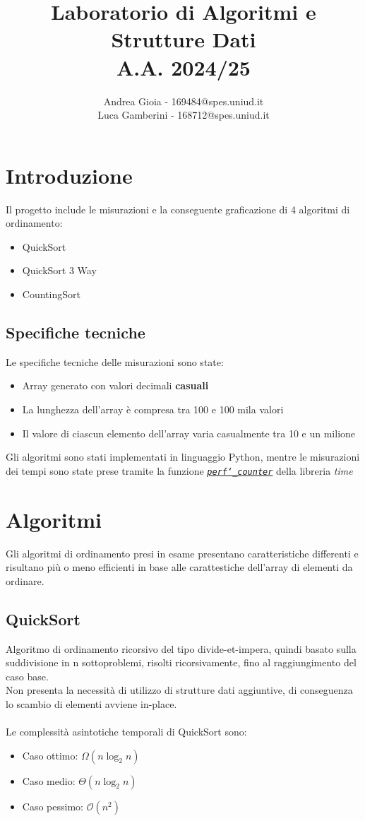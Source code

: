\documentclass[a4paper, 11pt]{article}
\title{Laboratorio di Algoritmi e Strutture Dati\\A.A. 2024/25}
\author{Andrea Gioia - 169484@spes.uniud.it\\Luca Gamberini - 168712@spes.uniud.it}
\begin{document}
\maketitle
\tableofcontents
\newpage
\section{Introduzione}
Il progetto include le misurazioni e la conseguente graficazione di 4 algoritmi di ordinamento:
\begin{itemize}
    \item QuickSort
    \item QuickSort 3 Way
    \item CountingSort
\end{itemize}
\subsection{Specifiche tecniche}
Le specifiche tecniche delle misurazioni sono state:
\begin{itemize}
    \item Array generato con valori decimali \textbf{casuali}
    \item La lunghezza dell'array è compresa tra 100 e 100 mila valori
    \item Il valore di ciascun elemento dell'array varia casualmente tra 10 e un milione
\end{itemize}
Gli algoritmi sono stati implementati in linguaggio Python, mentre le misurazioni dei tempi sono state prese tramite la funzione \href{https://docs.python.org/3/library/time.html#time.perf_counter}{\textit{\texttt{perf\char`_counter}}} della libreria \textit{time}

\section{Algoritmi}
Gli algoritmi di ordinamento presi in esame presentano caratteristiche differenti e risultano più o meno efficienti in base alle carattestiche dell'array di elementi da ordinare.

\subsection{QuickSort}
Algoritmo di ordinamento ricorsivo del tipo divide-et-impera, quindi basato sulla suddivisione in n sottoproblemi, risolti ricorsivamente, fino al raggiungimento del caso base.\\
Non presenta la necessità di utilizzo di strutture dati aggiuntive, di conseguenza lo scambio di elementi avviene in-place.\\\\
Le complessità asintotiche temporali di QuickSort sono:
\begin{itemize}
    \item Caso ottimo: $\Omega(n\log_2n)$
    \item Caso medio: $\Theta(n\log_2n)$
    \item Caso pessimo: $\mathcal{O}(n^2)$
\end{itemize}
\end{document}
